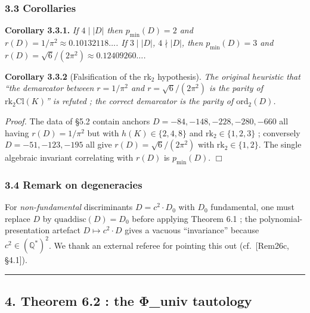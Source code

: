 \documentclass[
  11pt,
  a4paper,
]{amsart}
\begin{document}
\hypertarget{corollaries}{%
\subsubsection{3.3 Corollaries}\label{corollaries}}

\textbf{Corollary 3.3.1.} \emph{If \(4\mid |D|\) then \(p_{\min}(D)=2\) and \(r(D) = 1/\pi^{2} \approx 0.10132118\ldots\). If \(3\mid |D|\), \(4\nmid|D|\), then \(p_{\min}(D)=3\) and \(r(D) = \sqrt 6/(2\pi^{2}) \approx 0.12409260\ldots\).}

\textbf{Corollary 3.3.2} (Falsification of the rk\(_2\) hypothesis). \emph{The original heuristic that ``the demarcator between \(r = 1/\pi^{2}\) and \(r = \sqrt{6}/(2\pi^{2})\) is the parity of \(\mathrm{rk}_2\mathrm{Cl}(K)\)'' is refuted ; the correct demarcator is the parity of \(\mathrm{ord}_2(D)\).}

\emph{Proof.} The data of §5.2 contain anchors \(D = -84, -148, -228, -280, -660\) all having \(r(D) = 1/\pi^{2}\) but with \(h(K) \in \{2,4,8\}\) and \(\mathrm{rk}_2 \in \{1,2,3\}\) ; conversely \(D = -51, -123, -195\) all give \(r(D) = \sqrt 6/(2\pi^{2})\) with \(\mathrm{rk}_2 \in \{1,2\}\). The single algebraic invariant correlating with \(r(D)\) is \(p_{\min}(D)\). \(\Box\)

\hypertarget{remark-on-degeneracies}{%
\subsubsection{3.4 Remark on degeneracies}\label{remark-on-degeneracies}}

For \emph{non-fundamental} discriminants \(D = c^{2}\cdot D_0\) with \(D_0\) fundamental, one must replace \(D\) by \(\mathrm{quaddisc}(D) = D_0\) before applying Theorem 6.1 ; the polynomial-presentation artefact \(D \mapsto c^{2}\cdot D\) gives a vacuous ``invariance'' because \(c^{2}\in (\mathbb{Q}^{\ast})^{2}\). We thank an external referee for pointing this out (cf.~{[}Rem26c, §4.1{]}).

\begin{center}\rule{0.5\linewidth}{0.5pt}\end{center}

\hypertarget{theorem-6.2-the-ux3c6_univ-tautology}{%
\subsection{4. Theorem 6.2 : the Φ\_univ tautology}\label{theorem-6.2-the-ux3c6_univ-tautology}}
\end{document}
